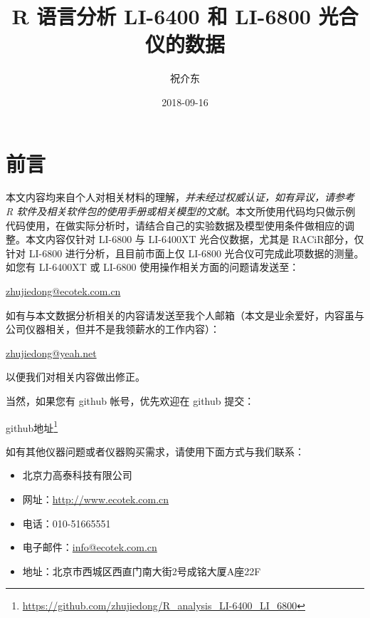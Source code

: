 \documentclass[]{krantz}
\title{R 语言分析 LI-6400 和 LI-6800 光合仪的数据}
\author{祝介东}
\date{2018-09-16}
\renewcommand{\href}[2]{#2\footnote{\url{#1}}}
\theoremstyle{definition}
\theoremstyle{definition}
\theoremstyle{definition}
\theoremstyle{remark}
\begin{document}
\maketitle


\thispagestyle{empty}

\begin{center}

\end{center}

\setlength{\abovedisplayskip}{-5pt}
\setlength{\abovedisplayshortskip}{-5pt}

{
\hypersetup{linkcolor=black}
\setcounter{tocdepth}{2}
\tableofcontents
}
\listoftables
\listoffigures
\frontmatter

\chapter*{前言}


本文内容均来自个人对相关材料的理解，\emph{并未经过权威认证，如有异议，请参考 R 软件及相关软件包的使用手册或相关模型的文献}。本文所使用代码均只做示例代码使用，在做实际分析时，请结合自己的实验数据及模型使用条件做相应的调整。本文内容仅针对
LI-6800 与 LI-6400XT 光合仪数据，尤其是 RACiR\texttrademark 部分，仅针对
LI-6800 进行分析，且目前市面上仅 LI-6800
光合仪可完成此项数据的测量。如您有 LI-6400XT 或 LI-6800
使用操作相关方面的问题请发送至：

\url{zhujiedong@ecotek.com.cn}

如有与本文数据分析相关的内容请发送至我个人邮箱（本文是业余爱好，内容虽与公司仪器相关，但并不是我领薪水的工作内容）：

\url{zhujiedong@yeah.net}

以便我们对相关内容做出修正。

当然，如果您有 github 帐号，优先欢迎在 github 提交：

\href{https://github.com/zhujiedong/R_analysis_LI-6400_LI_6800}{github地址}

如有其他仪器问题或者仪器购买需求，请使用下面方式与我们联系：

\begin{itemize}
\item
  北京力高泰科技有限公司
\item
  网址：\url{http://www.ecotek.com.cn}
\item
  电话：010-51665551
\item
  电子邮件：\url{info@ecotek.com.cn}
\item
  地址：北京市西城区西直门南大街2号成铭大厦A座22F
\end{itemize}
\end{document}
